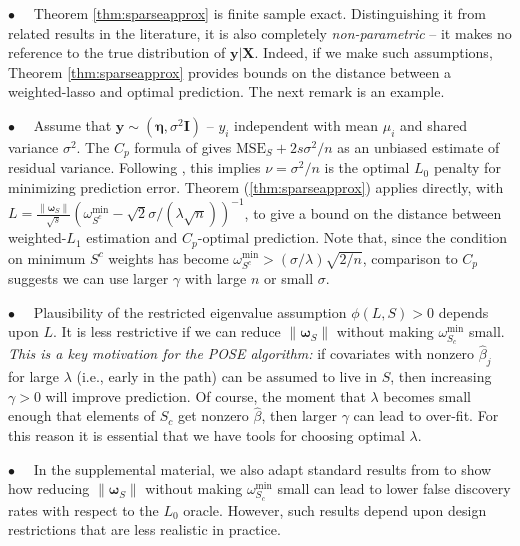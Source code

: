 \documentclass[twoside]{article}
\newcommand{\bs}[1]{\boldsymbol{#1}}
\newcommand{\mr}[1]{\mathrm{#1}}
\newcommand{\bm}[1]{\mathbf{#1}}
\begin{document}


\noindent $\bullet$~~  Theorem \ref{thm:sparseapprox} is finite sample exact.  Distinguishing it from
related results in the literature, it is  also completely
\textit{non-parametric} -- it makes no reference to the true distribution of
$\bm{y}|\bm{X}$.  Indeed, if we make such assumptions, Theorem
\ref{thm:sparseapprox} provides bounds on the distance between a
weighted-lasso and optimal prediction.  The next remark is an example.

\noindent $\bullet$~~ Assume that $\bm{y} \sim
(\bs{\eta},\sigma^2\bm{I})$ --  $y_i$ independent with mean $\mu_i$ and shared
variance $\sigma^2$.  The $C_p$ formula of
\cite{mallows_comments_1973} gives 
$\mr{MSE}_S + 2s\sigma^2/n$ as an unbiased estimate of residual variance.
Following \cite{efron_estimation_2004}, this implies $\nu = \sigma^2/n$ is the
optimal $L_0$ penalty for minimizing prediction error. Theorem
(\ref{thm:sparseapprox}) applies directly,  with $L =
\frac{\|\bs{\omega}_S\|}{\sqrt{s}}\left(\omega^{\mr{min}}_{S^c}-
\sqrt{2}\sigma/(\lambda\sqrt{n})\right)^{-1}$, to give a bound on the distance
between weighted-$L_1$ estimation and $C_p$-optimal prediction. Note that,
since the condition on minimum $S^c$ weights has become
$\omega^{\mr{min}}_{S^c} > (\sigma/\lambda)\sqrt{2/n}$, comparison to $C_p$
suggests we can use larger $\gamma$  with large $n$ or small $\sigma$.


\noindent $\bullet$~~  Plausibility of the restricted eigenvalue assumption
$\phi(L,S) > 0$ depends  upon $L$.  It is less restrictive if we can reduce
$\|\bs{\omega}_S\|$ without making $\omega^{\mr{min}}_{S_c}$ small.
\textit{This is a key motivation for the POSE algorithm:} if covariates with
nonzero $\hat \beta_j$ for large $\lambda$ (i.e., early in the path) can be
assumed to live in $S$, then increasing $\gamma >0$ will improve prediction.
Of course, the moment that $\lambda$ becomes small enough that elements of
$S_c$ get nonzero $\hat\beta$, then larger $\gamma$ can lead to over-fit.  For
this reason it is essential that we have tools for choosing  optimal
$\lambda$.

\noindent $\bullet$~~ In the supplemental material,  we also adapt standard
results from \cite{wainwright_sharp_2006,wainwright_sharp_2009} to show how
reducing $\|\bs{\omega}_S\|$ without making $\omega^{\mr{min}}_{S_c}$ small
can lead to lower false discovery rates with respect to the $L_0$ oracle.
However, such results depend upon design restrictions that are less realistic
in practice.
\end{document}
